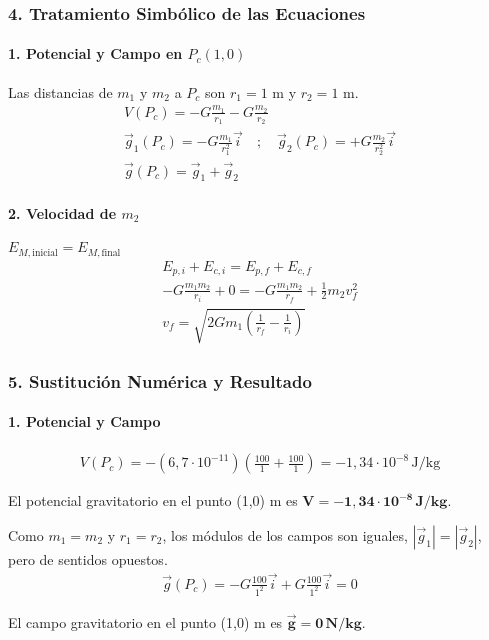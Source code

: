 \subsubsection*{4. Tratamiento Simbólico de las Ecuaciones}
\paragraph*{1. Potencial y Campo en $P_c(1,0)$}
Las distancias de $m_1$ y $m_2$ a $P_c$ son $r_1 = 1$ m y $r_2 = 1$ m.
\begin{gather}
    V(P_c) = -G\frac{m_1}{r_1} - G\frac{m_2}{r_2} \\
    \vec{g}_1(P_c) = -G\frac{m_1}{r_1^2} \vec{i} \quad ; \quad \vec{g}_2(P_c) = +G\frac{m_2}{r_2^2} \vec{i} \nonumber \\[8pt]
    \vec{g}(P_c) = \vec{g}_1 + \vec{g}_2
\end{gather}
\paragraph*{2. Velocidad de $m_2$}
$E_{M, \text{inicial}} = E_{M, \text{final}}$
\begin{gather}
    E_{p,i} + E_{c,i} = E_{p,f} + E_{c,f} \nonumber \\[8pt]
    -G\frac{m_1 m_2}{r_i} + 0 = -G\frac{m_1 m_2}{r_f} + \frac{1}{2} m_2 v_f^2 \nonumber \\[8pt]
    v_f = \sqrt{2 G m_1 \left(\frac{1}{r_f} - \frac{1}{r_i}\right)}
\end{gather}

\subsubsection*{5. Sustitución Numérica y Resultado}
\paragraph*{1. Potencial y Campo}
\begin{gather}
    V(P_c) = -(6,7\cdot10^{-11}) \left( \frac{100}{1} + \frac{100}{1} \right) = -1,34 \cdot 10^{-8} \, \text{J/kg}
\end{gather}
\begin{cajaresultado}
    El potencial gravitatorio en el punto (1,0) m es $\boldsymbol{V = -1,34 \cdot 10^{-8} \, \textbf{J/kg}}$.
\end{cajaresultado}
\medskip
Como $m_1=m_2$ y $r_1=r_2$, los módulos de los campos son iguales, $|\vec{g}_1| = |\vec{g}_2|$, pero de sentidos opuestos.
\begin{gather}
    \vec{g}(P_c) = -G\frac{100}{1^2}\vec{i} + G\frac{100}{1^2}\vec{i} = 0
\end{gather}
\begin{cajaresultado}
    El campo gravitatorio en el punto (1,0) m es $\boldsymbol{\vec{g} = 0 \, \textbf{N/kg}}$.
\end{cajaresultado}

